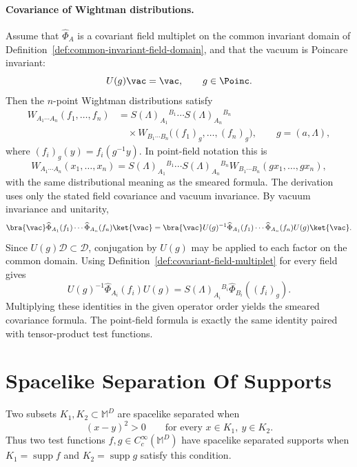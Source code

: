 \paragraph{Covariance of Wightman distributions.}
Assume that \(\widehat\Phi_A\) is a covariant field multiplet on the common
invariant domain of Definition~\ref{def:common-invariant-field-domain}, and
that the vacuum is Poincare invariant:
\[
  U(g)\vac=\vac,\qquad g\in\Poinc .
\]
Then the \(n\)-point Wightman distributions satisfy
\[
\begin{split}
  W_{A_1\cdots A_n}(f_1,\ldots,f_n)
  &=
  S(\Lambda)_{A_1}{}^{B_1}\cdots
  S(\Lambda)_{A_n}{}^{B_n}
\\
  &\quad \times
  W_{B_1\cdots B_n}\bigl((f_1)_g,\ldots,(f_n)_g\bigr),
  \qquad g=(a,\Lambda),
\end{split}
\]
where \((f_i)_g(y)=f_i(g^{-1}y)\).  In point-field notation this is
\[
  W_{A_1\cdots A_n}(x_1,\ldots,x_n)
  =
  S(\Lambda)_{A_1}{}^{B_1}\cdots S(\Lambda)_{A_n}{}^{B_n}
  W_{B_1\cdots B_n}(gx_1,\ldots,gx_n),
\]
with the same distributional meaning as the smeared formula.  The derivation
uses only the stated field covariance and vacuum invariance.
By vacuum invariance and unitarity,
\[
  \bra{\vac}\widehat\Phi_{A_1}(f_1)\cdots\widehat\Phi_{A_n}(f_n)\ket{\vac}
  =
  \bra{\vac}
  U(g)^{-1}\widehat\Phi_{A_1}(f_1)\cdots
  \widehat\Phi_{A_n}(f_n)U(g)
  \ket{\vac}.
\]
Since \(U(g)\mathcal D\subset\mathcal D\), conjugation by \(U(g)\) may be
applied to each factor on the common domain.  Using
Definition~\ref{def:covariant-field-multiplet} for every field gives
\[
  U(g)^{-1}\widehat\Phi_{A_i}(f_i)U(g)
  =
  S(\Lambda)_{A_i}{}^{B_i}\widehat\Phi_{B_i}((f_i)_g).
\]
Multiplying these identities in the given operator order yields the smeared
covariance formula.  The point-field formula is exactly the same identity
paired with tensor-product test functions.

\section{Spacelike Separation Of Supports}

\begin{definition}
\label{def:spacelike-separated-supports}
Two subsets \(K_1,K_2\subset\mathbb M^D\) are spacelike separated when
\[
  (x-y)^2>0
  \qquad
  \text{for every }x\in K_1,\ y\in K_2 .
\]
Thus two test functions \(f,g\in C_c^\infty(\mathbb M^D)\) have spacelike
separated supports when \(K_1=\operatorname{supp}f\) and
\(K_2=\operatorname{supp}g\) satisfy this condition.
\end{definition}

